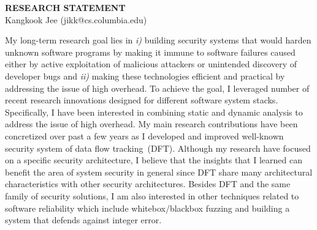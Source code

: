 \documentclass[letterpaper, 10pt]{article}
\begin{document}
\begin{small}

\begin{center}
{\LARGE \bf RESEARCH STATEMENT}\\
\vspace*{0.1cm}
{\normalsize Kangkook Jee (jikk@cs.columbia.edu)}
\end{center}



My long-term research goal lies in {\it i)} building security systems that
would harden unknown software programs by making it immune to software failures
caused either by active exploitation of malicious attackers or unintended
discovery of developer bugs and {\it ii)} making these technologies efficient
and practical by addressing the issue of high overhead.
%
To achieve the goal, I leveraged number of recent research innovations designed
for different software system stacks. Specifically, I have been interested in
combining static and dynamic analysis to address the issue of high overhead.
%
My main research contributions have been concretized over past a few years as I
developed and improved well-known security system of data flow tracking~(DFT).
Although my research have focused on a specific security architecture, I
believe that the insights that I learned can benefit the area of system
security in general since DFT share many architectural characteristics with
other security architectures.
%
Besides DFT and the same family of security solutions, I am also interested in
other techniques related to software reliability which include
whitebox/blackbox fuzzing and building a system that defends against integer
error.


\end{small}
\end{document}
